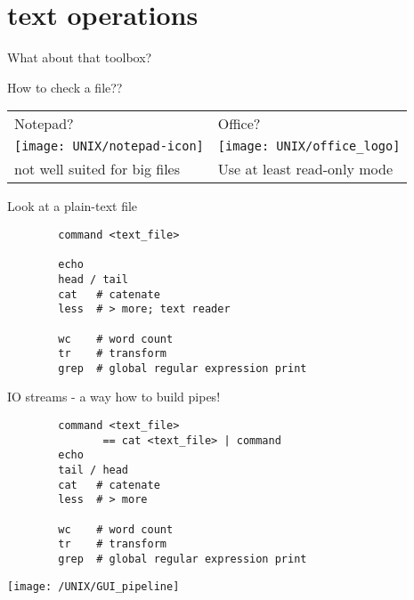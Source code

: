 \documentclass[xcolor=dvipsnames]{beamer}
\begin{document}
\section{text operations}

\begin{frame}
	\Huge
	\begin{center}
		What about that toolbox?
	\end{center}
\end{frame}

\begin{frame}
	\begin{center}
	\huge
	How to check a file?? \\
	\vspace{1cm}

	\Large
	\begin{tabular}{C{0.4\textwidth}C{0.4\textwidth}}
	Notepad? & Office? \\
	\texttt{[image: UNIX/notepad-icon]} & \texttt{[image: UNIX/office\_logo]} \\
	\small not well suited for big files & \small Use at least read-only mode\\
	\end{tabular}
	\end{center}
\end{frame}

\begin{frame}[fragile]
	\huge
	Look at a plain-text file
	\Large
	\begin{verbatim}
		command <text_file>

		echo
		head / tail
		cat   # catenate
		less  # > more; text reader

		wc    # word count
		tr    # transform
		grep  # global regular expression print
	\end{verbatim}
\end{frame}

\begin{frame}[fragile]
	\huge
	IO streams - a way how to build pipes!
	\Large
	\begin{verbatim}
		command <text_file>
	           == cat <text_file> | command
		echo
		tail / head
		cat   # catenate
		less  # > more

		wc    # word count
		tr    # transform
		grep  # global regular expression print
	\end{verbatim}
\end{frame}

\begin{frame}
	\begin{center}
		\texttt{[image: /UNIX/GUI\_pipeline]}
	\end{center}
\end{frame}
\end{document}
